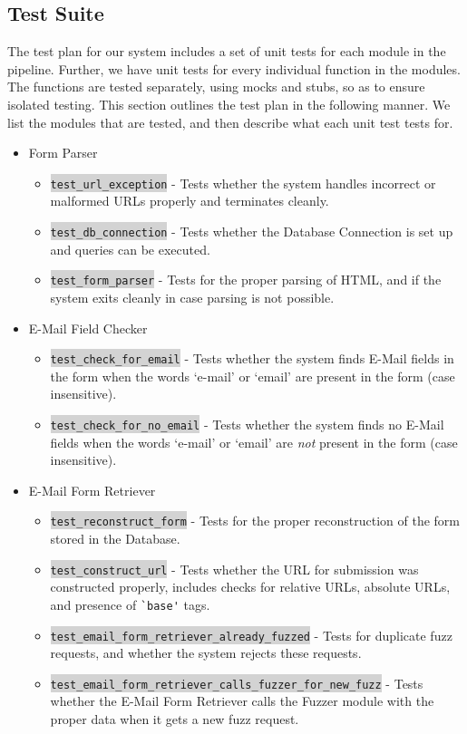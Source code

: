 \subsection{Test Suite}
\label{Arch:Test}
The test plan for our system includes a set of unit tests for each module in the pipeline. Further, we have unit tests for every %
individual function in the modules. The functions are tested separately, using mocks and stubs, so as to ensure isolated testing.
This section outlines the test plan in the following manner. We list the modules that are tested, and then describe what each unit test tests for.
\begin{itemize}
	\item Form Parser
	\begin{itemize}
		\item \colorbox{lightgray}{\lstinline{test_url_exception}} - Tests whether the system handles incorrect or malformed URLs properly and terminates cleanly.
		\item \colorbox{lightgray}{\lstinline{test_db_connection}} - Tests whether the Database Connection is set up and queries can be executed.
		\item \colorbox{lightgray}{\lstinline{test_form_parser}} - Tests for the proper parsing of HTML, and if the system exits cleanly in case parsing is not possible.
	\end{itemize}
	
	\item E-Mail Field Checker
	\begin{itemize}
		\item \colorbox{lightgray}{\lstinline{test_check_for_email}} - Tests whether the system finds E-Mail fields in the form when the words `e-mail' or `email' are present in the form (case insensitive).
		\item \colorbox{lightgray}{\lstinline{test_check_for_no_email}} - Tests whether the system finds no E-Mail fields when the words `e-mail' or `email' are \emph{not} present in the form (case insensitive).
	\end{itemize}
	
	\item E-Mail Form Retriever
	\begin{itemize}
		\item \colorbox{lightgray}{\lstinline{test_reconstruct_form}} - Tests for the proper reconstruction of the form stored in the Database.
		\item \colorbox{lightgray}{\lstinline{test_construct_url}} - Tests whether the URL for submission was constructed properly, includes checks for relative URLs, absolute URLs, and presence of \lstinline{`base'} tags.
		\item \colorbox{lightgray}{\lstinline{test_email_form_retriever_already_fuzzed}} - Tests for duplicate fuzz requests, and whether the system rejects these requests.
		\item \colorbox{lightgray}{\lstinline{test_email_form_retriever_calls_fuzzer_for_new_fuzz}} - Tests whether the E-Mail Form Retriever calls the Fuzzer module with the proper data when it gets a new fuzz request.
	\end{itemize}
	

\end{itemize}
